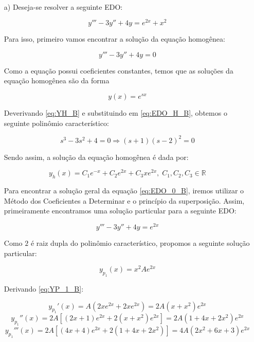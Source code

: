 \documentclass[12pt,a4paper]{article}
\newcommand{\re}{\mathbb{R}}
\begin{document}
 \\

\begin{itemize}
\item[a)] Deseja-se resolver a seguinte EDO:

\begin{equation}\label{eq:EDO_0_B}
y''' - 3y'' + 4y = e^{2x} + x^2
\end{equation}

Para isso, primeiro vamos encontrar a solução da equação homogênea:

\begin{equation}\label{eq:EDO_H_B}
y''' - 3y'' + 4y = 0
\end{equation}

Como a equação possui coeficientes constantes, temos que as soluções da equação homogênea são da forma

\begin{equation} \label{eq:YH_B}
y(x) = e^{sx}
\end{equation}
 
Deverivando \eqref{eq:YH_B} e substituindo em \eqref{eq:EDO_H_B}, obtemos o seguinte polinômio característico:

$$ s^3 - 3s^2 + 4 = 0 \Rightarrow (s+1)(s-2)^2 = 0 $$

Sendo assim, a solução da equação homogênea é dada por:

$$ y_h(x) = C_1 e^{-x} + C_2 e^{2x} + C_3 x e^{2x}, \; C_1, C_2, C_3 \in \re $$

Para encontrar a solução geral da equação \eqref{eq:EDO_0_B}, iremos utilizar o Método dos Coeficientes a Determinar e o princípio da superposição. Assim, primeiramente encontramos uma solução particular para a seguinte EDO:

\begin{equation} \label{eq:EDO_1_B}
y''' - 3y'' + 4y = e^{2x}
\end{equation}

Como $2$ é raiz dupla do polinômio característico, propomos a seguinte solução particular:

\begin{equation} \label{eq:YP_1_B}
y_{p_1}(x) = x^2 A e^{2x}
\end{equation}

Derivando \eqref{eq:YP_1_B}:

$$ y_{p_1}'(x) = A (2x e^{2x} + 2x e^{2x}) = 2A (x+x^2) e^{2x} $$
$$ y_{p_1}''(x) = 2A [ (2x+1)e^{2x} + 2(x+x^2)e^{2x} ]  = 2A(1 + 4x + 2x^2) e^{2x}  $$
$$ y_{p_1}'''(x) = 2A[ (4x+4)e^{2x} + 2(1+4x+2x^2)] = 4A (2x^2 + 6x + 3) e^{2x}  $$


\end{itemize}
\end{document}
